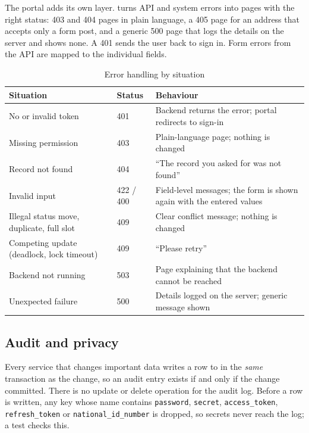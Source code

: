The portal adds its own layer.  turns API and system errors into
pages with the right status: 403 and 404 pages in plain language, a 405 page for an
address that accepts only a form post, and a generic 500 page that logs the details on the
server and shows none. A 401 sends the user back to sign in. Form errors from the API are
mapped to the individual fields.

\begin{table}[H]
\centering\small
\caption{Error handling by situation}\label{tab:errors}
\begin{tabularx}{\linewidth}{@{}p{3.6cm}p{2.0cm}X@{}}
\toprule \textbf{Situation} & \textbf{Status} & \textbf{Behaviour}\\ \midrule
No or invalid token & 401 & Backend returns the error; portal redirects to sign-in\\
Missing permission & 403 & Plain-language page; nothing is changed\\
Record not found & 404 & ``The record you asked for was not found''\\
Invalid input & 422 / 400 & Field-level messages; the form is shown again with the entered values\\
Illegal status move, duplicate, full slot & 409 & Clear conflict message; nothing is changed\\
Competing update (deadlock, lock timeout) & 409 & ``Please retry''\\
Backend not running & 503 & Page explaining that the backend cannot be reached\\
Unexpected failure & 500 & Details logged on the server; generic message shown\\
\bottomrule
\end{tabularx}
\end{table}

\subsection{Audit and privacy}
Every service that changes important data writes a row to  in the
\emph{same} transaction as the change, so an audit entry exists if and only if the change
committed. There is no update or delete operation for the audit log. Before a row is
written, any key whose name contains \texttt{password}, \texttt{secret},
\texttt{access\_token}, \texttt{refresh\_token} or \texttt{national\_id\_number} is dropped,
so secrets never reach the log; a test checks this.
